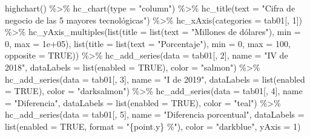 \documentclass[
]{book}
\newenvironment{Shaded}{\begin{snugshade}}{\end{snugshade}}
\newcommand{\AttributeTok}[1]{\textcolor[rgb]{0.77,0.63,0.00}{#1}}
\newcommand{\ConstantTok}[1]{\textcolor[rgb]{0.00,0.00,0.00}{#1}}
\newcommand{\DecValTok}[1]{\textcolor[rgb]{0.00,0.00,0.81}{#1}}
\newcommand{\FloatTok}[1]{\textcolor[rgb]{0.00,0.00,0.81}{#1}}
\newcommand{\FunctionTok}[1]{\textcolor[rgb]{0.00,0.00,0.00}{#1}}
\newcommand{\NormalTok}[1]{#1}
\newcommand{\SpecialCharTok}[1]{\textcolor[rgb]{0.00,0.00,0.00}{#1}}
\newcommand{\StringTok}[1]{\textcolor[rgb]{0.31,0.60,0.02}{#1}}
\begin{document}
\begin{Shaded}
\begin{Highlighting}[]
\FunctionTok{highchart}\NormalTok{() }\SpecialCharTok{\%\textgreater{}\%} \FunctionTok{hc\_chart}\NormalTok{(}\AttributeTok{type =} \StringTok{"column"}\NormalTok{) }\SpecialCharTok{\%\textgreater{}\%} \FunctionTok{hc\_title}\NormalTok{(}\AttributeTok{text =} \StringTok{"Cifra de negocio de las 5 mayores tecnológicas"}\NormalTok{) }\SpecialCharTok{\%\textgreater{}\%} 
  \FunctionTok{hc\_xAxis}\NormalTok{(}\AttributeTok{categories =}\NormalTok{ tab01[, }\DecValTok{1}\NormalTok{]) }\SpecialCharTok{\%\textgreater{}\%} \FunctionTok{hc\_yAxis\_multiples}\NormalTok{(}\FunctionTok{list}\NormalTok{(}\AttributeTok{title =} \FunctionTok{list}\NormalTok{(}\AttributeTok{text =} \StringTok{"Millones de dólares"}\NormalTok{), }
  \AttributeTok{min =} \DecValTok{0}\NormalTok{, }\AttributeTok{max =} \FloatTok{1e+05}\NormalTok{), }\FunctionTok{list}\NormalTok{(}\AttributeTok{title =} \FunctionTok{list}\NormalTok{(}\AttributeTok{text =} \StringTok{"Porcentaje"}\NormalTok{), }
  \AttributeTok{min =} \DecValTok{0}\NormalTok{, }\AttributeTok{max =} \DecValTok{100}\NormalTok{, }\AttributeTok{opposite =} \ConstantTok{TRUE}\NormalTok{)) }\SpecialCharTok{\%\textgreater{}\%} \FunctionTok{hc\_add\_series}\NormalTok{(}\AttributeTok{data =}\NormalTok{ tab01[, }
  \DecValTok{2}\NormalTok{], }\AttributeTok{name =} \StringTok{"IV de 2018"}\NormalTok{, }\AttributeTok{dataLabels =} \FunctionTok{list}\NormalTok{(}\AttributeTok{enabled =} \ConstantTok{TRUE}\NormalTok{), }
  \AttributeTok{color =} \StringTok{"salmon"}\NormalTok{) }\SpecialCharTok{\%\textgreater{}\%} \FunctionTok{hc\_add\_series}\NormalTok{(}\AttributeTok{data =}\NormalTok{ tab01[, }\DecValTok{3}\NormalTok{], }
  \AttributeTok{name =} \StringTok{"I de 2019"}\NormalTok{, }\AttributeTok{dataLabels =} \FunctionTok{list}\NormalTok{(}\AttributeTok{enabled =} \ConstantTok{TRUE}\NormalTok{), }
  \AttributeTok{color =} \StringTok{"darksalmon"}\NormalTok{) }\SpecialCharTok{\%\textgreater{}\%} \FunctionTok{hc\_add\_series}\NormalTok{(}\AttributeTok{data =}\NormalTok{ tab01[, }
  \DecValTok{4}\NormalTok{], }\AttributeTok{name =} \StringTok{"Diferencia"}\NormalTok{, }\AttributeTok{dataLabels =} \FunctionTok{list}\NormalTok{(}\AttributeTok{enabled =} \ConstantTok{TRUE}\NormalTok{), }
  \AttributeTok{color =} \StringTok{"teal"}\NormalTok{) }\SpecialCharTok{\%\textgreater{}\%} \FunctionTok{hc\_add\_series}\NormalTok{(}\AttributeTok{data =}\NormalTok{ tab01[, }\DecValTok{5}\NormalTok{], }
  \AttributeTok{name =} \StringTok{"Diferencia porcentual"}\NormalTok{, }\AttributeTok{dataLabels =} \FunctionTok{list}\NormalTok{(}\AttributeTok{enabled =} \ConstantTok{TRUE}\NormalTok{, }
    \AttributeTok{format =} \StringTok{"\{point.y\} \%"}\NormalTok{), }\AttributeTok{color =} \StringTok{"darkblue"}\NormalTok{, }\AttributeTok{yAxis =} \DecValTok{1}\NormalTok{)}
\end{Highlighting}
\end{Shaded}
\end{document}

